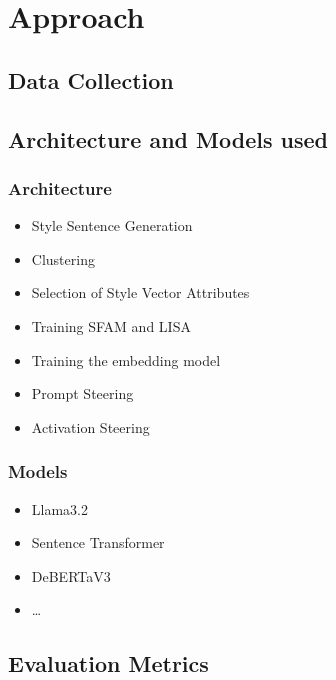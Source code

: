 \chapter{Approach}
\label{sec:approach}


\section{Data Collection}
\label{sec:approach:data_collection}


\section{Architecture and Models used}
\label{sec:approach:architecture_models}

\subsection{Architecture}
\label{sec:approach:architecture_models:architecture}

\begin{itemize}
  \item Style Sentence Generation
  \item Clustering
  \item Selection of Style Vector Attributes
  \item Training SFAM and LISA
  \item Training the embedding model
  \item Prompt Steering
  \item Activation Steering
\end{itemize}

\subsection{Models}
\label{sec:approach:architecture_models:models}

\begin{itemize}
  \item Llama3.2
  \item Sentence Transformer
  \item DeBERTaV3
  \item \ldots
\end{itemize}


\section{Evaluation Metrics}
\label{sec:approach:evaluation_metrics}


